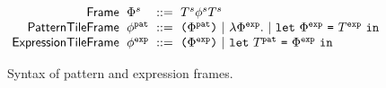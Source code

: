 \begin{figure}
  \vspace{-3px}
  \[
  \arraycolsep=3pt\begin{array}{rlrl}
      \mathsf{Frame} & \tframe^s & ::= & \tiles^s\tfrelem^s\tiles^s \\
      \mathsf{PatternTileFrame} & \tfrelem^{\pat} & ::= &
        \sparen{\tframe^{\pat}} ~\vert~
        \slam{\tframe^{\expr}}{} ~\vert~
        \slet{\tframe^{\expr}}{\tiles^{\expr}}{} \\
      \mathsf{ExpressionTileFrame} & \tfrelem^{\expr} & ::= &
        \sparen{\tframe^{\expr}} ~\vert~
        \slet{\tiles^{\pat}}{\tframe^{\expr}}{}
  \end{array}\]
  \caption{
    Syntax of pattern and expression frames.
  }
  \label{fig:tile-syntax}
\end{figure}
